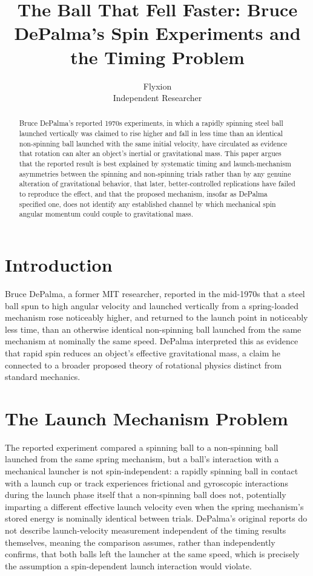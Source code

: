 \documentclass[11pt]{article}
\title{The Ball That Fell Faster: Bruce DePalma's Spin Experiments and the Timing Problem}
\author{Flyxion \\ \small Independent Researcher}
\date{}
\begin{document}
\maketitle

\begin{abstract}
Bruce DePalma's reported 1970s experiments, in which a rapidly spinning steel ball launched vertically was claimed to rise higher and fall in less time than an identical non-spinning ball launched with the same initial velocity, have circulated as evidence that rotation can alter an object's inertial or gravitational mass. This paper argues that the reported result is best explained by systematic timing and launch-mechanism asymmetries between the spinning and non-spinning trials rather than by any genuine alteration of gravitational behavior, that later, better-controlled replications have failed to reproduce the effect, and that the proposed mechanism, insofar as DePalma specified one, does not identify any established channel by which mechanical spin angular momentum could couple to gravitational mass.
\end{abstract}

\section{Introduction}

Bruce DePalma, a former MIT researcher, reported in the mid-1970s that a steel ball spun to high angular velocity and launched vertically from a spring-loaded mechanism rose noticeably higher, and returned to the launch point in noticeably less time, than an otherwise identical non-spinning ball launched from the same mechanism at nominally the same speed. DePalma interpreted this as evidence that rapid spin reduces an object's effective gravitational mass, a claim he connected to a broader proposed theory of rotational physics distinct from standard mechanics.

\section{The Launch Mechanism Problem}

The reported experiment compared a spinning ball to a non-spinning ball launched from the same spring mechanism, but a ball's interaction with a mechanical launcher is not spin-independent: a rapidly spinning ball in contact with a launch cup or track experiences frictional and gyroscopic interactions during the launch phase itself that a non-spinning ball does not, potentially imparting a different effective launch velocity even when the spring mechanism's stored energy is nominally identical between trials. DePalma's original reports do not describe launch-velocity measurement independent of the timing results themselves, meaning the comparison assumes, rather than independently confirms, that both balls left the launcher at the same speed, which is precisely the assumption a spin-dependent launch interaction would violate.
\end{document}
